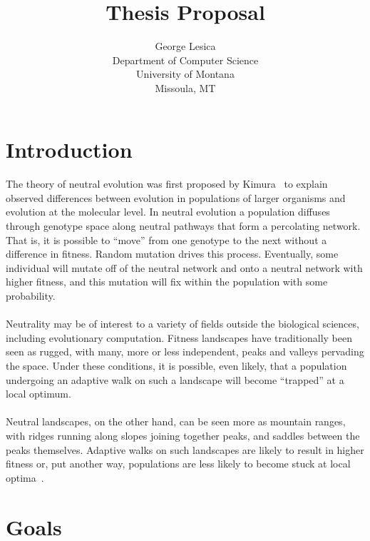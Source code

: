 \documentclass[12pt,letterpaper,titlepage,draft]{article}
\title{Thesis Proposal}
\author{George Lesica\\
Department of Computer Science\\
University of Montana\\
Missoula, MT}
\begin{document}
\maketitle

\section{Introduction}

\paragraph{}
The theory of neutral evolution was first proposed by Kimura~\cite{Kimura1984}
to explain observed differences between evolution in populations of larger
organisms and evolution at the molecular level. In neutral evolution a
population diffuses through genotype space along neutral pathways that form a
percolating network. That is, it is possible to ``move'' from one genotype to
the next without a difference in fitness. Random mutation drives this process.
Eventually, some individual will mutate off of the neutral network and onto a
neutral network with higher fitness, and this mutation will fix within the
population with some probability.

\paragraph{}
Neutrality may be of interest to a variety of fields outside the biological
sciences, including evolutionary computation. Fitness landscapes have
traditionally been seen as rugged, with many, more or less independent, peaks
and valleys pervading the space. Under these conditions, it is possible, even
likely, that a population undergoing an adaptive walk on such a landscape will
become ``trapped'' at a local optimum.

\paragraph{}
Neutral landscapes, on the other hand, can be seen more as mountain ranges,
with ridges running along slopes joining together peaks, and saddles between
the peaks themselves. Adaptive walks on such landscapes are likely to result in
higher fitness or, put another way, populations are less likely to become stuck
at local optima~\cite{Newman1998}.

\section{Goals}
\end{document}
